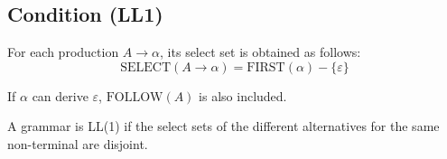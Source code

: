 \documentclass[12pt,letterpaper]{article}
\begin{document}
\subsection{Condition (LL1)}

For each production $A \rightarrow \alpha$, its select set is obtained as follows:
$$\text{SELECT}(A \rightarrow \alpha) = \text{FIRST}(\alpha) - \{\varepsilon\}$$

If $\alpha$ can derive $\varepsilon$, $\text{FOLLOW}(A)$ is also included.

A grammar is LL(1) if the select sets of the different alternatives for the same non-terminal are disjoint.

\end{document}
